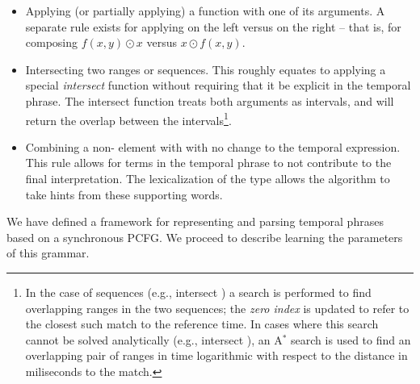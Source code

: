 \begin{itemize}
	\item Applying (or partially applying) a function with one of its
			arguments.
		A separate rule exists for applying on the left versus on the right --
		that is, for composing $f(x,y) \odot x$ versus $x \odot f(x,y)$.
	\item Intersecting two ranges or sequences.
		This roughly equates to applying a special \textit{intersect} function
			without requiring that it be explicit in the temporal phrase.
		The intersect function treats both arguments as intervals, and will return
			the overlap between the intervals\footnote{
				In the case of sequences (e.g.,  intersect ) a
					search is performed to find overlapping ranges in the two sequences;
					the \textit{zero index} is updated to refer to the closest such
					match to the reference time.
				In cases where this search cannot be solved analytically
					(e.g.,  intersect ), an A$^{*}$
					search is used to find an overlapping pair of ranges
					in time logarithmic with respect to
					the distance in miliseconds to the match.
		}.

	\item Combining a non- element with  with no change to the
			temporal expression.
		This rule allows for terms in the temporal phrase to not contribute 
			to the final interpretation.
			The lexicalization of the  type allows the algorithm
			to take hints from these supporting words.
\end{itemize}

We have defined a framework for representing and parsing temporal phrases
	based on a synchronous PCFG.
We proceed to describe learning the parameters of this grammar.

